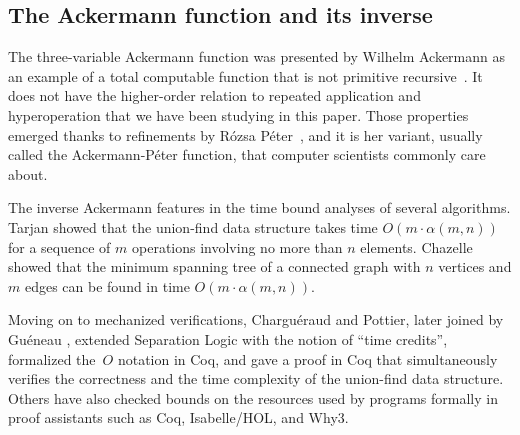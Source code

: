 \subsection{The Ackermann function and its inverse}
The three-variable Ackermann function was presented by
Wilhelm Ackermann as an example of a total computable function that
is not primitive recursive~\cite{ackermann}.
It does not have the higher-order
relation to repeated application and hyperoperation that we have been studying in
this paper. Those properties emerged thanks to refinements by Rózsa Péter~\cite{peter},
and it is her variant, usually called the Ackermann-Péter function, 
that computer scientists commonly care about.

The inverse Ackermann
features in the time bound analyses of several algorithms.
Tarjan \cite{tarjan} showed that the union-find data structure
takes time $O(m\cdot\alpha(m,n))$ for a sequence of $m$ operations
involving no more than $n$ elements. 
Chazelle \cite{chazelle} showed that the minimum spanning tree
of a connected graph with $n$ vertices and $m$ edges
can be found in time $O(m\cdot\alpha(m,n))$.

Moving on to mechanized verifications, Charguéraud and Pottier, 
later joined by Guéneau \cite{charpott,gueneauetal},
extended Separation Logic with the notion of ``time credits'',
formalized the~$O$ notation in Coq,
and gave a proof in Coq that simultaneously verifies the correctness
and the time complexity of the union-find data structure. Others
\cite{others2,others4,others3,others1}
have also checked bounds on the resources
used by programs formally in proof assistants such as Coq, Isabelle/HOL, and Why3.


